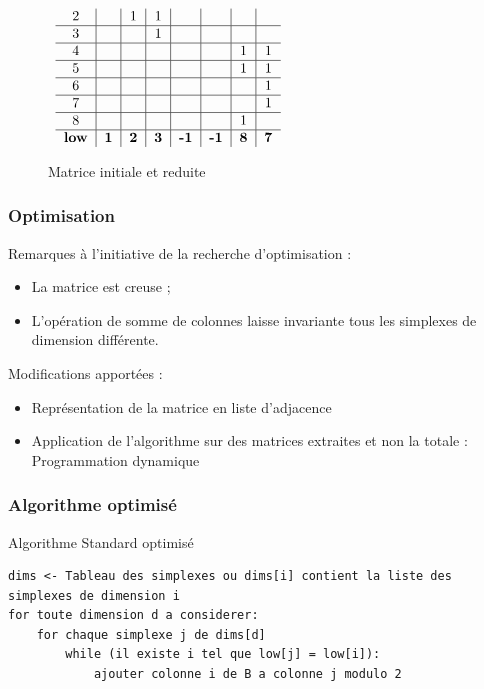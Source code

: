 \documentclass{beamer}
\begin{document}
\begin{frame}
\begin{figure}
\begin{math}
\begin{array}{cc}
\begin{tabular}{ c | c | c | c | c | c | c | c }
                2 &   & 1 & 1 &   &   &   &    \\ \hline
                3 &   &   & 1 &   &   &   &    \\ \hline
                4 &   &   &   &   &   & 1 & 1  \\ \hline
                5 &   &   &   &   &   & 1 & 1  \\ \hline
                6 &   &   &   &   &   &   & 1  \\ \hline
                7 &   &   &   &   &   &   & 1  \\ \hline
                8 &   &   &   &   &   & 1 &     \\ \hline
                \textbf{low} & \textbf{1} & \textbf{2} & \textbf{3} & 
                \textbf{-1} & \textbf{-1} & \textbf{8} & \textbf{7}
            \end{tabular}
        \end{array}
        \end{math}
        \caption{Matrice initiale et reduite}
    \end{figure}
\end{frame}

\begin{frame}
    \frametitle{Optimisation}
    Remarques à l'initiative de la recherche d'optimisation :
    \begin{itemize}
        \item La matrice est creuse ;
        \item L'opération de somme de colonnes laisse invariante tous les simplexes de dimension différente.
    \end{itemize}

    Modifications apportées :
    \begin{itemize}
        \item Représentation de la matrice en liste d'adjacence
        \item Application de l'algorithme sur des matrices extraites et non la totale : Programmation dynamique
    \end{itemize}
\end{frame}

\begin{frame}[fragile]
    \frametitle{Algorithme optimisé}
    \begin{block}{Algorithme Standard optimisé}
        \fontsize{9.5}{10}\selectfont
        \begin{lstlisting}
dims <- Tableau des simplexes ou dims[i] contient la liste des simplexes de dimension i
for toute dimension d a considerer:
    for chaque simplexe j de dims[d]
        while (il existe i tel que low[j] = low[i]):
            ajouter colonne i de B a colonne j modulo 2
      \end{lstlisting}
    \end{block}
\end{frame}
\end{document}
